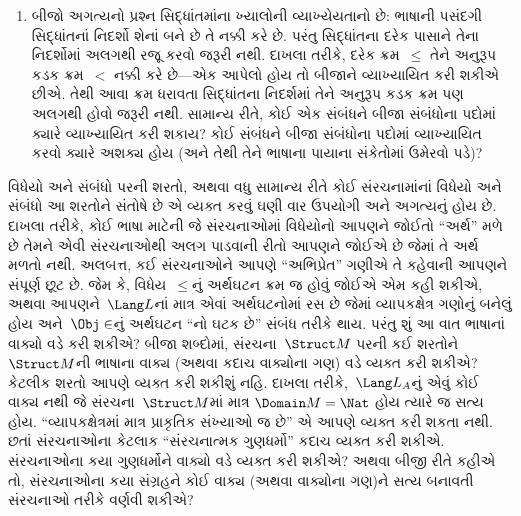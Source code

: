 \begin{explain}
\begin{enumerate}
  સ્વયંસિદ્ધિ બીજાંનું ફલિત હોઈ શકે છે અને તેથી અનાવશ્યક હોઈ શકે છે.
  $\Gamma$માંનું સ્વયંસિદ્ધિ~$!A$ અનાવશ્યક છે એ
  $\Gamma \setminus \{!A\} \Entails !A$ સાબિત કરીને બતાવી શકીએ છીએ.
  વળી, $(\Gamma \setminus \{!A\}) \cup \{\lnot !A\}$ સંતોષ્ય છે એમ
  બતાવીને તે સ્વયંસિદ્ધિ અનાવશ્યક નથી એ પણ સાબિત કરી શકીએ છીએ. દાખલા
  તરીકે, ભૂમિતિની બીજી સ્વયંસિદ્ધિઓથી સમાંતર સ્વયંસિદ્ધિ સ્વતંત્ર છે
  તે આ જ રીતે બતાવવામાં આવ્યું હતું.
\item બીજો અગત્યનો પ્રશ્ન સિદ્ધાંતમાંના ખ્યાલોની વ્યાખ્યેયતાનો છે:
  ભાષાની પસંદગી સિદ્ધાંતનાં નિદર્શો શેનાં બને છે તે નક્કી કરે છે.
  પરંતુ સિદ્ધાંતના દરેક પાસાને તેના નિદર્શોમાં અલગથી રજૂ કરવો જરૂરી
  નથી. દાખલા તરીકે, દરેક ક્રમ~$\le$ તેને અનુરૂપ કડક ક્રમ~$<$ નક્કી કરે
  છે---એક આપેલો હોય તો બીજાને વ્યાખ્યાયિત કરી શકીએ છીએ. તેથી આવા ક્રમ
  ધરાવતા સિદ્ધાંતના નિદર્શમાં તેને અનુરૂપ કડક ક્રમ પણ અલગથી હોવો
  જરૂરી નથી. સામાન્ય રીતે, કોઈ એક સંબંધને બીજા સંબંધોના પદોમાં ક્યારે
  વ્યાખ્યાયિત કરી શકાય? કોઈ સંબંધને બીજા સંબંધોના પદોમાં વ્યાખ્યાયિત
  કરવો ક્યારે અશક્ય હોય (અને તેથી તેને ભાષાના પાયાના સંકેતોમાં ઉમેરવો
  પડે)?
\end{enumerate}
\end{explain}
\endgroup


\begingroup
\makeatletter{}\makeatother


\label{guunit:OLP-0169}


\begin{explain}
વિધેયો અને સંબંધો પરની શરતો, અથવા વધુ સામાન્ય રીતે કોઈ સંરચનામાંનાં
વિધેયો અને સંબંધો આ શરતોને સંતોષે છે એ વ્યક્ત કરવું ઘણી વાર ઉપયોગી અને
અગત્યનું હોય છે. દાખલા તરીકે, કોઈ ભાષા માટેની જે સંરચનાઓમાં
વિધેયોનો આપણને જોઈતો ``અર્થ'' મળે છે તેમને એવી
સંરચનાઓથી અલગ પાડવાની રીતો આપણને જોઈએ છે જેમાં તે અર્થ મળતો
નથી. અલબત્ત, કઈ સંરચનાઓને આપણે ``અભિપ્રેત'' ગણીએ તે કહેવાની
આપણને સંપૂર્ણ છૂટ છે. જેમ કે, વિધેય~$\le$નું અર્થઘટન ક્રમ જ
હોવું જોઈએ એમ કહી શકીએ, અથવા આપણને~$\Lang L$નાં માત્ર એવાં અર્થઘટનોમાં
રસ છે જેમાં વ્યાપકક્ષેત્ર ગણોનું બનેલું હોય અને~$\Obj \in$નું
અર્થઘટન ``નો ઘટક છે'' સંબંધ તરીકે થાય. પરંતુ શું આ વાત ભાષાનાં
વાક્યો વડે કરી શકીએ? બીજા શબ્દોમાં, સંરચના~$\Struct M$
પરની કઈ શરતોને~$\Struct M$ની ભાષાના વાક્ય (અથવા કદાચ
વાક્યોના ગણ) વડે વ્યક્ત કરી શકીએ? કેટલીક શરતો આપણે વ્યક્ત કરી
શકીશું નહિ. દાખલા તરીકે,~$\Lang L_A$નું એવું કોઈ વાક્ય નથી જે
સંરચના~$\Struct M$માં માત્ર $\Domain M=\Nat$ હોય ત્યારે જ સત્ય
હોય. ``વ્યાપકક્ષેત્રમાં માત્ર પ્રાકૃતિક સંખ્યાઓ જ છે'' એ આપણે વ્યક્ત
કરી શકતા નથી. છતાં સંરચનાઓના કેટલાક ``સંરચનાત્મક ગુણધર્મો''
કદાચ વ્યક્ત કરી શકીએ. સંરચનાઓના કયા ગુણધર્મોને વાક્યો
વડે વ્યક્ત કરી શકીએ? અથવા બીજી રીતે કહીએ તો, સંરચનાઓના કયા
સંગ્રહને કોઈ વાક્ય (અથવા વાક્યોના ગણ)ને સત્ય બનાવતી
સંરચનાઓ તરીકે વર્ણવી શકીએ?
\end{explain}

